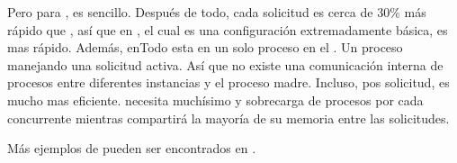 Pero para \nodejsNAME, es sencillo. Después de todo, cada solicitud es cerca de 30\% más rápido que \phpNAME, así que en \performanceQA, el cual es una configuración extremadamente básica, \nodejsNAME es mas rápido. Además, en\nodejsNAME Todo esta en un solo proceso en el \serverAS. Un proceso manejando una solicitud activa. Así que no existe una comunicación interna de procesos entre diferentes instancias y el proceso madre. Incluso, pos solicitud, \nodejsNAME es mucho mas eficiente. \phpApacheNAME necesita muchísimo \phpNAME y sobrecarga de procesos por cada \workerClientINT concurrente mientras \nodejsNAME compartirá la mayoría de su memoria entre las solicitudes.


Más ejemplos de \benchmarkQA pueden ser encontrados en \cite{online_nodejs_java_appdynamics}.


